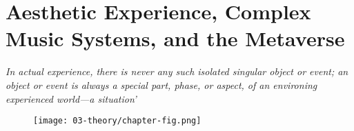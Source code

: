 \chapter{Aesthetic Experience, Complex Music Systems, and the Metaverse}
\label{sec: theory}
\epigraph{\emph{In actual experience, there is never any such isolated singular object or event; an object or event is always a special part, phase, or aspect, of an environing experienced world—a situation'}}{\citep[p. 67]{dewey1934}}

\begin{figure}
    \centering
    \texttt{[image: 03-theory/chapter-fig.png]}
    \captionsetup{labelformat=empty}
    \caption[\autoref*{sec: theory}'s page-figure: Three photographs from the Sensory Cartographies project, (from , \citeyear{tonn2017})]{}
\end{figure}

\clearpage

